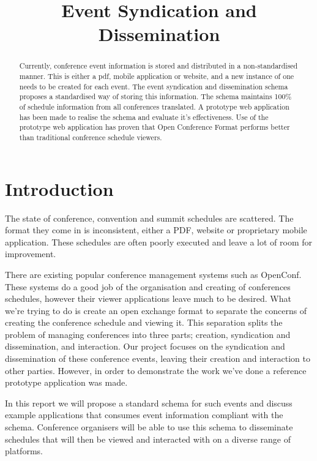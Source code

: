 \documentclass[conference]{IEEEtran}
\title{Event Syndication and Dissemination}
\author{
  \IEEEauthorblockN{Christopher Morgan}
  \IEEEauthorblockA {
    Department of Electrical and Computer Engineering \\
    University of Auckland, Auckland, New Zealand
    }
}
\begin{document}


\maketitle

\begin{abstract}
Currently, conference event information is stored and distributed in a non-standardised manner. This is either a pdf, mobile application or website, and a new instance of one needs to be created for each event. The event syndication and dissemination schema proposes a standardised way of storing this information. The schema maintains 100\% of schedule information from all conferences translated. A prototype web application has been made to realise the schema and evaluate it's effectiveness. Use of the prototype web application has proven that Open Conference Format performs better than traditional conference schedule viewers.
\end{abstract}


\section{Introduction}
The state of conference, convention and summit schedules are scattered. The format they come in is inconsistent, either a PDF, website or proprietary mobile application. These schedules are often poorly executed and leave a lot of room for improvement.

There are existing popular conference management systems such as OpenConf\cite{openconfWebsite}. These systems do a good job of the organisation and creating of conferences schedules, however their viewer applications leave much to be desired. What we're trying to do is create an open exchange format to separate the concerns of creating the conference schedule and viewing it. This separation splits the problem of managing conferences into three parts; creation, syndication and dissemination, and interaction. Our project focuses on the syndication and dissemination of these conference events, leaving their creation and interaction to other parties. However, in order to demonstrate the work we've done a reference prototype application was made.

In this report we will propose a standard schema for such events and discuss example applications that consumes event information compliant with the schema. Conference organisers will be able to use this schema to disseminate schedules that will then be viewed and interacted with on a diverse range of platforms.
\end{document}
